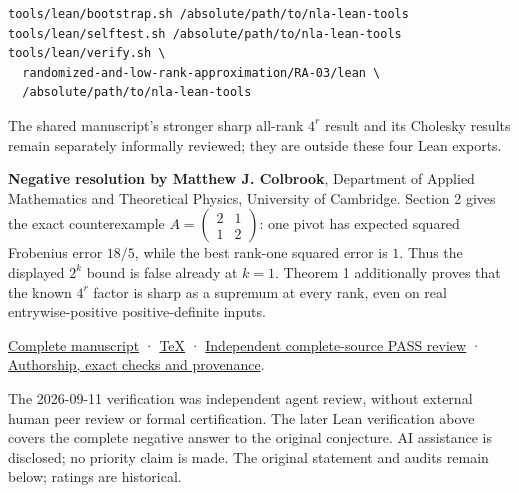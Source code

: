 \documentclass[11pt,a4paper]{article}
\makeatletter
\renewcommand{\subsection}{\Needspace{4\baselineskip}\@startsection{subsection}{2}{0pt}{9pt plus 1pt minus 1pt}{3pt}{\sffamily\bfseries\normalsize\color{ink}}}
\makeatother
\begin{document}
\begin{verbatim}
tools/lean/bootstrap.sh /absolute/path/to/nla-lean-tools
tools/lean/selftest.sh /absolute/path/to/nla-lean-tools
tools/lean/verify.sh \
  randomized-and-low-rank-approximation/RA-03/lean \
  /absolute/path/to/nla-lean-tools
\end{verbatim}

The shared manuscript's stronger sharp all-rank \(4^r\) result and its
Cholesky results remain separately informally reviewed; they are outside
these four Lean exports.

\subsection{Resolution --- 2026-09-11}\label{resolution-2026-09-11}

\textbf{Negative resolution by Matthew J. Colbrook}, Department of
Applied Mathematics and Theoretical Physics, University of Cambridge.
Section 2 gives the exact counterexample
\(A=\left(\begin{smallmatrix}2&1\\1&2\end{smallmatrix}\right)\): one
pivot has expected squared Frobenius error \(18/5\), while the best
rank-one squared error is \(1\). Thus the displayed \(2^k\) bound is
false already at \(k=1\). Theorem 1 additionally proves that the known
\(4^r\) factor is sharp as a supremum at every rank, even on real
entrywise-positive positive-definite inputs.

\href{https://github.com/ajt60gaibb/OpenProblemsInNLA/blob/main/references/colbrook-random-pivoting-2026-09-11/manuscripts/sharp_random_pivoting.pdf}{Complete
manuscript} ·
\href{https://github.com/ajt60gaibb/OpenProblemsInNLA/blob/main/references/colbrook-random-pivoting-2026-09-11/manuscripts/sharp_random_pivoting.tex}{TeX}
·
\href{https://github.com/ajt60gaibb/OpenProblemsInNLA/blob/main/references/colbrook-random-pivoting-2026-09-11/verification/reviews/RA-03-review.md}{Independent
complete-source PASS review} ·
\href{https://github.com/ajt60gaibb/OpenProblemsInNLA/blob/main/references/colbrook-random-pivoting-2026-09-11/README.md}{Authorship,
exact checks and provenance}.

The 2026-09-11 verification was independent agent review, without
external human peer review or formal certification. The later Lean
verification above covers the complete negative answer to the original
conjecture. AI assistance is disclosed; no priority claim is made. The
original statement and audits remain below; ratings are historical.
\end{document}
